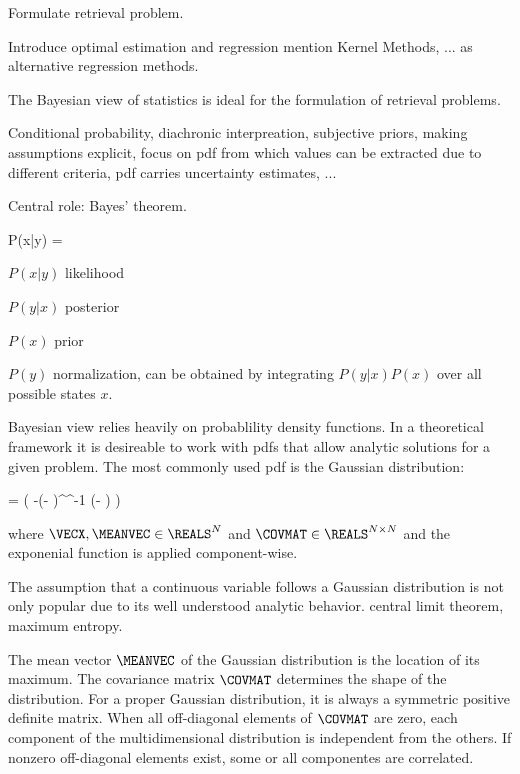 Formulate retrieval problem.

Introduce optimal estimation and regression mention Kernel Methods, ... as
alternative regression methods.

\startsection[title=Bayesian Statistics]

    The Bayesian view of statistics is ideal for the formulation of retrieval
    problems. 

    Conditional probability, diachronic interpreation, subjective priors,
    making assumptions explicit, focus on pdf from which values can be
    extracted due to different criteria, pdf carries uncertainty estimates, ...

    Central role: Bayes' theorem.
    
    \startformula
        P(x|y) = 
    \stopformula

    $P(x|y)$ likelihood

    $P(y|x)$ posterior

    $P(x)$ prior

    $P(y)$ normalization, can be obtained by integrating $P(y|x)P(x)$
    over all possible states $x$.

\stopsection

\startsection[title=The Multivariate Gaussian Distribution]

    Bayesian view relies heavily on probablility density functions. In a
    theoretical framework it is desireable to work with pdfs that allow
    analytic solutions for a given problem. The most commonly used pdf is the
    Gaussian distribution:

    \startformula
        \GAUSS{\VECX}{\MEANVEC}{\COVMAT}
        = 
          \exp \left( -(\VECX - \MEANVEC)^\top \COVMAT^{-1} (\VECX - \MEANVEC) \right)
    \stopformula

    where $\VECX, \MEANVEC \in \REALS^N$ and $\COVMAT \in \REALS^{N
    \times N}$ and the exponenial function is applied component-wise.

    The assumption that a continuous variable follows a Gaussian distribution
    is not only popular due to its well understood analytic behavior. central
    limit theorem, maximum entropy.

    The mean vector $\MEANVEC$ of the Gaussian distribution is the
    location of its maximum. The covariance matrix $\COVMAT$ determines
    the shape of the distribution. For a proper Gaussian distribution, it is
    always a symmetric positive definite matrix. When all off-diagonal elements
    of $\COVMAT$ are zero, each component of the multidimensional
    distribution is independent from the others. If nonzero off-diagonal
    elements exist, some or all componentes are correlated.

